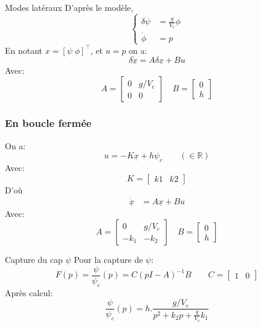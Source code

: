 \documentclass[tikz, footheight=2em]{beamer}
\begin{document}
\begin{frame}{Modes lat\'eraux}
    D'apr\`es le mod\`ele,
    \[
        \left\lbrace
        \begin{aligned}
            \delta \dot{\psi} &= \frac{g}{V_e}\phi \\
            \dot{\phi} &= p
        \end{aligned}
        \right.
    \] \pause{}
    En notant \(x = {[\psi \; \phi]}^\top \), et \( u = p \) on a:
    \[
    \delta \underline{\dot{x}} = A \delta \underline{x} + B u
    \] \pause{}
    Avec:
    \[
    A = \begin{bmatrix}
           0 & g/V_e\\
           0 & 0
       \end{bmatrix}
       \quad
       B = \begin{bmatrix}
           0 \\ h
       \end{bmatrix}
   \]
\end{frame}

\begin{frame}
    \frametitle{En boucle fermée} \pause{}
    On a:
    \[
    u = -K \underline{x} + h \psi_c \qquad (\in \mathbb{R})
    \] \pause{}
    Avec:
    \[
    K = \begin{bmatrix}
           k1 & k2
       \end{bmatrix}
   \] \pause{}
   D'où
   \[
       \begin{aligned}
           \dot{\underline{x}} &= A\underline{x} + Bu
       \end{aligned}
    \] \pause{}
    Avec:
    \[
       A = \begin{bmatrix}
           0 & g/V_e\\
           -k_1 & -k_2
       \end{bmatrix}
       \quad
       B = \begin{bmatrix}
           0 \\ h
       \end{bmatrix}
   \]
\end{frame}


\begin{frame}{Capture du cap \( \psi \)}
    Pour la capture de \( \psi \):
    \[
    F(p) = \frac{\psi}{\psi_c}(p) = C{(pI - A)}^{-1}B \qquad C=\begin{bmatrix}
            1 & 0
        \end{bmatrix}
    \] \pause{}
    Après calcul:
    \begin{equation*}
        \boxed{
            \frac{\psi}{\psi_c}(p) = h . \frac{g/V_e}{p^2 + k_2 p + \frac{g}{V_e}k_1}
        }
    \end{equation*}
\end{frame}
\end{document}
